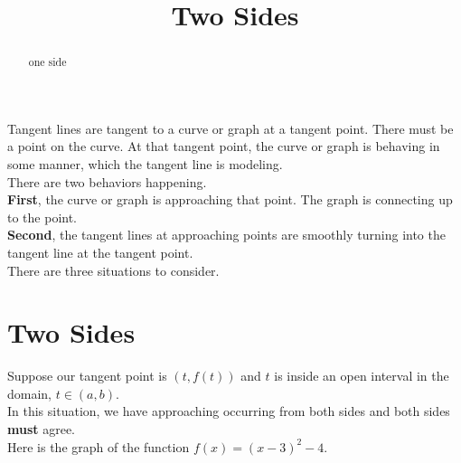 \documentclass{ximera}
\title{Two Sides}
\begin{document}
\begin{abstract}
one side
\end{abstract}
\maketitle




Tangent lines are tangent to a curve or graph at a tangent point. There must be a point on the curve. At that tangent point, the curve or graph is behaving in some manner, which the tangent line is modeling.  \\

There are two behaviors happening. \\



\textbf{First}, the curve or graph is approaching that point. The graph is connecting up to the point.\\

\textbf{Second}, the tangent lines at approaching points are smoothly turning into the tangent line at the tangent point. \\



There are three situations to consider. \\




\section{Two Sides}


Suppose our tangent point is $(t, f(t))$ and $t$ is inside an open interval in the domain, $t \in (a, b)$. \\


In this situation, we have approaching occurring from both sides and both sides \textbf{must} agree. \\





Here is the graph of the function $f(x) = (x - 3)^2 - 4$.
\end{document}
